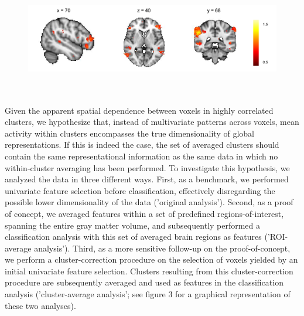 \documentclass[jou,12pt,a4paper]{apa6}
\begin{document}
\begin{figure}[ht]
\centering
\includegraphics[width=\textwidth,height=5cm]{UnivariateFeatureSelection}
\end{figure}

Given the apparent spatial dependence between voxels in highly correlated clusters, we hypothesize that, instead of multivariate patterns across voxels, mean activity within clusters encompasses the true dimensionality of global representations. If this is indeed the case, the set of averaged clusters should contain the same representational information as the same data in which no within-cluster averaging has been performed. To investigate this hypothesis, we analyzed the data in three different ways. First, as a benchmark, we performed univariate feature selection before classification, effectively disregarding the possible lower dimensionality of the data ('original analysis'). Second, as a proof of concept, we averaged features within a set of predefined regions-of-interest, spanning the entire gray matter volume, and subsequently performed a classification analysis with this set of averaged brain regions as features ('ROI-average analysis'). Third, as a more sensitive follow-up on the proof-of-concept, we perform a cluster-correction procedure on the selection of voxels yielded by an initial univariate feature selection. Clusters resulting from this cluster-correction procedure are subsequently averaged and used as features in the classification analysis ('cluster-average analysis'; see figure 3 for a graphical representation of these two analyses). 
\end{document}
